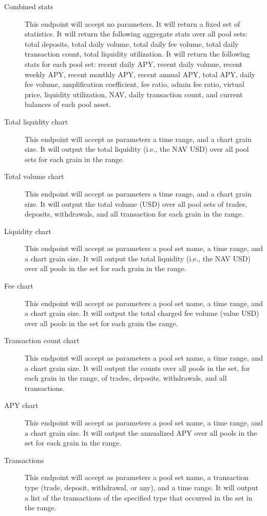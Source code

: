 \documentclass[12pt]{article}
\begin{document}
\begin{description}
	\item[Combined stats] This endpoint will accept no parameters. It will return a fixed set of statistics. It will return the following aggregate stats over all pool sets: total deposits, total daily volume, total daily fee volume, total daily transaction count, total liquidity utilization. It will return the following stats for each pool set: recent daily APY, recent daily volume, recent weekly APY, recent monthly APY, recent annual APY, total APY, daily fee volume, amplification coefficient, fee ratio, admin fee ratio, virtual price, liquidity utilization, NAV, daily transaction count, and current balances of each pool asset.
	\item[Total liquidity chart] This endpoint will accept as parameters a time range, and a chart grain size. It will output the total liquidity (i.e., the NAV USD) over all pool sets for each grain in the range.
	\item[Total volume chart] This endpoint will accept as parameters a time range, and a chart grain size. It will output the total volume (USD) over all pool sets of trades, deposits, withdrawals, and all transaction for each grain in the range.
	\item[Liquidity chart] This endpoint will accept as parameters a pool set name, a time range, and a chart grain size. It will output the total liquidity (i.e., the NAV USD) over all pools in the set for each grain in the range.
	\item[Fee chart] This endpoint will accept as parameters a pool set name, a time range, and a chart grain size. It will output the total charged fee volume (value USD) over all pools in the set for each grain the range.
	\item[Transaction count chart] This endpoint will accept as parameters a pool set name, a time range, and a chart grain size. It will output the counts over all pools in the set, for each grain in the range, of trades, deposits, withdrawals, and all transactions.
	\item[APY chart] This endpoint will accept as parameters a pool set name, a time range, and a chart grain size. It will output the annualized APY over all pools in the set for each grain in the range.
	\item[Transactions] This endpoint will accept as parameters a pool set name, a transaction type (trade, deposit, withdrawal, or any), and a time range. It will output a list of the transactions of the specified type that occurred in the set in the range.

\end{description}
\end{document}
